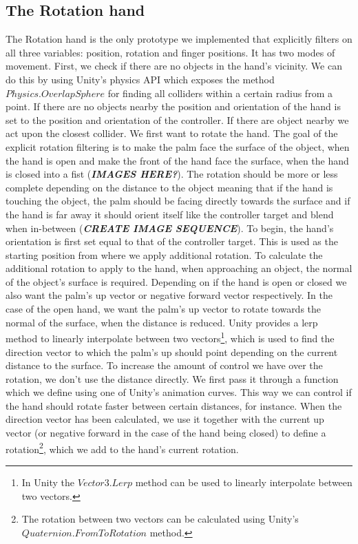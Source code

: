 \subsection{The Rotation hand}
\label{subsec:rotationHand}
The Rotation hand is the only prototype we implemented that explicitly filters on all three variables: position, rotation and finger positions. It has two modes of movement. First, we check if there are no objects in the hand's vicinity. We can do this by using Unity's physics API which exposes the method $Physics.OverlapSphere$ for finding all colliders within a certain radius from a point. If there are no objects nearby the position and orientation of the hand is set to the position and orientation of the controller. If there are object nearby we act upon the closest collider. We first want to rotate the hand. The goal of the explicit rotation filtering is to make the palm face the surface of the object, when the hand is open and make the front of the hand face the surface, when the hand is closed into a fist (\textbf{\textit{IMAGES HERE?}}). The rotation should be more or less complete depending on the distance to the object meaning that if the hand is touching the object, the palm should be facing directly towards the surface and if the hand is far away it should orient itself like the controller target and blend when in-between (\textbf{\textit{CREATE IMAGE SEQUENCE}}). To begin, the hand's orientation is first set equal to that of the controller target. This is used as the starting position from where we apply additional rotation. To calculate the additional rotation to apply to the hand, when approaching an object, the normal of the object's surface is required. Depending on if the hand is open or closed we also want the palm's up vector or negative forward vector respectively. In the case of the open hand, we want the palm's up vector to rotate towards the normal of the surface, when the distance is reduced. Unity provides a lerp method to linearly interpolate between two vectors\footnote{In Unity the $Vector3.Lerp$ method can be used to linearly interpolate between two vectors.}, which is used to find the direction vector to which the palm's up should point depending on the current distance to the surface. To increase the amount of control we have over the rotation, we don't use the distance directly. We first pass it through a function which we define using one of Unity's animation curves. This way we can control if the hand should rotate faster between certain distances, for instance. When the direction vector has been calculated, we use it together with the current up vector (or negative forward in the case of the hand being closed) to define a rotation\footnote{The rotation between two vectors can be calculated using Unity's $Quaternion.FromToRotation$ method.}, which we add to the hand's current rotation.

